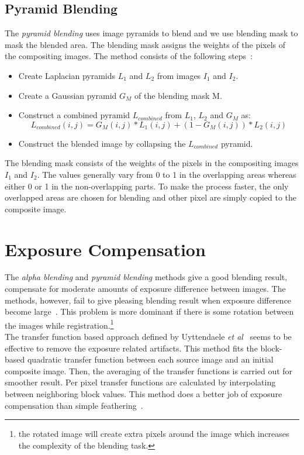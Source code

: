 \subsection{Pyramid Blending}
\label{sec:laplacian-pyramid-blending}
The \emph{pyramid blending} uses image pyramids to blend and we use blending mask to mask the blended area. The blending mask assigns the weights of the pixels of the compositing images. The method consists of the following steps~\cite{Szeliski:06}:
\begin{itemize}
	\item Create Laplacian pyramids $L_1$ and $L_2$ from images $I_1$ and $I_2$.
	\item Create a Gaussian pyramid $G_M$ of the blending mask M. 
	\item Construct a combined pyramid $L_{combined}$ from $L_1$, $L_2$ and $G_M$ as:
	\begin{equation}
	L_{combined}(i,j)=G_M(i,j)*L_1(i,j)+(1-G_M(i,j))*L_2(i,j)
	\label{eq:combined_pyramid}
	\end{equation}
	\item Construct the blended image by collapsing the $L_{combined}$ pyramid.
\end{itemize}
The blending mask consists of the weights of the pixels in the compositing images $I_1$ and $I_2$. The values generally vary from 0 to 1 in the overlapping areas whereas either 0 or 1 in the non-overlapping parts. To make the process faster, the only overlapped areas are chosen for blending and other pixel are simply copied to the composite image.


\section{Exposure Compensation}
\label{sec:exposure-compensation}
The \emph{alpha blending} and \emph{pyramid blending} methods give a good blending result, compensate for moderate amounts of exposure difference between images. The methods, however, fail to give pleasing blending result when exposure difference become large~\cite{Szeliski:06}. This problem is more dominant if there is some rotation between the images while registration.\footnote{the rotated image will create extra pixels around the image which increases the complexity of the blending task.}\\

\noindent The transfer function based approach defined by Uyttendaele \emph{et al}~\cite{uyttendaele:01} seems to be effective to remove the exposure related artifacts. This method fits the block-based quadratic transfer function between each source image and an initial composite image. Then, the averaging of the transfer functions is carried out for smoother result. Per pixel transfer functions are calculated by interpolating between neighboring block values. This method does a better job of exposure compensation than simple feathering~\cite{uyttendaele:01}.\\

